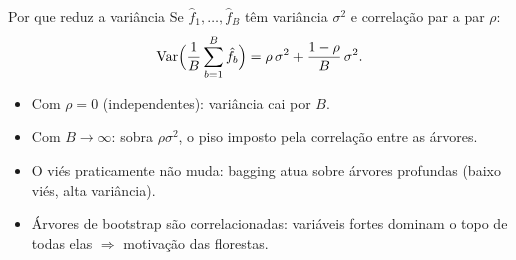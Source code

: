 \begin{frame}{Por que reduz a variância}
Se $\hat f_1,\dots,\hat f_B$ têm variância $\sigma^2$ e correlação par a par $\rho$:
\[
\operatorname{Var}\Bigl(\frac1B\sum_{b=1}^B\hat f_b\Bigr)=\rho\,\sigma^2+\frac{1-\rho}{B}\,\sigma^2 .
\]
\begin{itemize}
  \item Com $\rho=0$ (independentes): variância cai por $B$.
  \item Com $B\to\infty$: sobra $\rho\sigma^2$, o \alert{piso} imposto pela correlação entre as árvores.
  \item O viés praticamente não muda: bagging atua sobre árvores profundas (baixo viés, alta variância).
  \item Árvores de bootstrap são \alert{correlacionadas}: variáveis fortes dominam o topo de todas elas $\Rightarrow$ motivação das florestas.
\end{itemize}
\end{frame}
